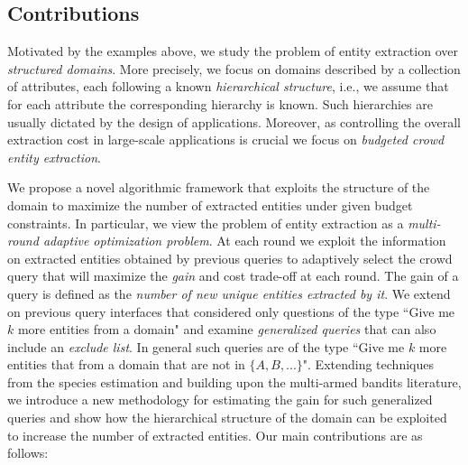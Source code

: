 \subsection{Contributions}
\label{sec:contributions}
Motivated by the examples above, we study the problem of entity extraction over {\em structured domains}. More precisely, we focus on domains described by a collection of attributes, each following a known {\em hierarchical structure}, i.e., we assume that for each attribute the corresponding hierarchy is known. Such hierarchies are usually dictated by the design of applications. Moreover, as controlling the overall extraction cost in large-scale applications is crucial we focus on {\em budgeted crowd entity extraction}. 

We propose a novel algorithmic framework that exploits the structure of the domain to maximize the number of extracted entities under given budget constraints. In particular, we view the problem of entity extraction as a {\em multi-round adaptive optimization problem}. At  each round we exploit the information on extracted entities obtained by previous queries to adaptively select the crowd query that will maximize the {\em gain} and cost trade-off at each round. The gain of a query is defined as the {\em number of new unique entities extracted by it}. We extend on previous query interfaces that considered only questions of the type ``Give me $k$ more entities from a domain" and examine {\em generalized queries} that can also include an {\em exclude list}. In general such queries are of the type ``Give me $k$ more entities that from a domain that are not in $\{A, B, ...\}$". Extending techniques from the species estimation and building upon the multi-armed bandits literature, we introduce a new methodology for estimating the gain for such generalized queries and show how the hierarchical structure of the domain can be exploited to increase the number of extracted entities. Our main contributions are as follows:

